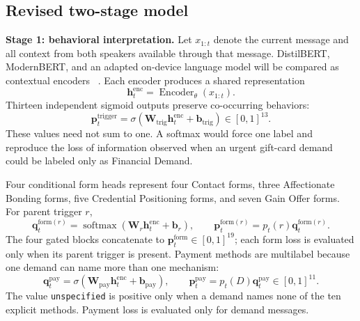 \documentclass[letterpaper,11pt]{article}
\begin{document}
\subsection{Revised two-stage model}
\textbf{Stage 1: behavioral interpretation.} Let $x_{1:t}$ denote the current
message and all context from both speakers available through that message.
DistilBERT, ModernBERT,
and an adapted on-device language model will be compared as contextual encoders
~\cite{sanh2019distilbert,warner2024modernbert,hu2022lora}. Each encoder produces
a shared representation
\begin{equation}
 \mathbf h_t^{\mathrm{enc}}=\operatorname{Encoder}_{\theta}(x_{1:t}).
 \label{eq:shared-encoder}
\end{equation}
Thirteen independent sigmoid outputs preserve co-occurring behaviors:
\begin{equation}
 \mathbf p_t^{\mathrm{trigger}}=
 \sigma(\mathbf W_{\mathrm{trig}}\mathbf h_t^{\mathrm{enc}}+
 \mathbf b_{\mathrm{trig}})\in[0,1]^{13}.
 \label{eq:trigger-head}
\end{equation}
These values need not sum to one. A softmax would force one label and reproduce
the loss of information observed when an urgent gift-card demand could be labeled
only as Financial Demand.

Four conditional form heads represent four Contact forms, three Affectionate
Bonding forms, five Credential Positioning forms, and seven Gain Offer forms.
For parent trigger $r$,
\begin{equation}
 \mathbf q_t^{\mathrm{form}(r)}=
 \operatorname{softmax}(\mathbf W_r\mathbf h_t^{\mathrm{enc}}+\mathbf b_r),
 \qquad
 \mathbf p_t^{\mathrm{form}(r)}=p_t(r)\mathbf q_t^{\mathrm{form}(r)}.
 \label{eq:form-head}
\end{equation}
The four gated blocks concatenate to
$\mathbf p_t^{\mathrm{form}}\in[0,1]^{19}$; each form loss is evaluated only when
its parent trigger is present. Payment methods are multilabel because one demand
can name more than one mechanism:
\begin{equation}
 \mathbf q_t^{\mathrm{pay}}=
 \sigma(\mathbf W_{\mathrm{pay}}\mathbf h_t^{\mathrm{enc}}+\mathbf b_{\mathrm{pay}}),
 \qquad
 \mathbf p_t^{\mathrm{pay}}=p_t(D)\mathbf q_t^{\mathrm{pay}}
 \in[0,1]^{11}.
 \label{eq:payment-head}
\end{equation}
The value \texttt{unspecified} is positive only when a demand names none of the
ten explicit methods. Payment loss is evaluated only for demand messages.
\end{document}
